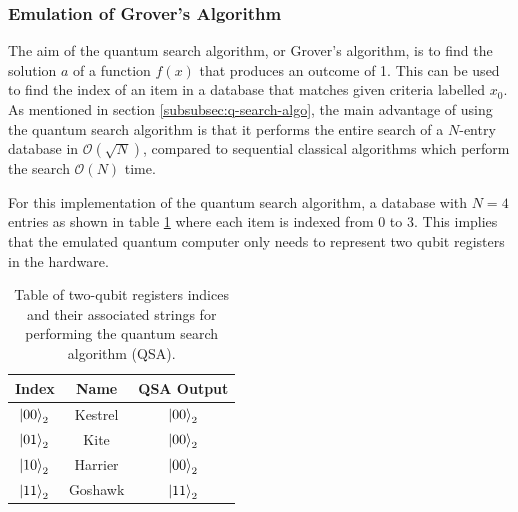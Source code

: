 \subsubsection{Emulation of Grover's Algorithm}

The aim of the quantum search algorithm, or Grover's algorithm, is to find the solution $a$ of a function $f(x)$ that produces an outcome of 1. This can be used to find the index of an item in a database that matches given criteria labelled $x_0$. As mentioned in section \ref{subsubsec:q-search-algo}, the main advantage of using the quantum search algorithm is that it performs the entire search of a $N$-entry database in $\mathcal{O}(\sqrt{N})$, compared to sequential classical algorithms which perform the search $\mathcal{O}(N)$ time. 

For this implementation of the quantum search algorithm, a database with $N = 4$ entries as shown in table \ref{tab:grover-entries} where each item is indexed from 0 to 3. This implies that the emulated quantum computer only needs to represent two qubit registers in the hardware. 

\begin{table}[ht!]
	\centering
	\caption[Table Showing Indices and their Associated Strings for Performing the Quantum Search Algorithm.]{Table of two-qubit registers indices and their associated strings for performing the quantum search algorithm (QSA).}
	\label{tab:grover-entries}
	\begin{tabular}{ |c|c|c| } 
		\hline
		\textbf{Index} & \textbf{Name} & \textbf{QSA Output}\\ 
		\hline
		$\ket{00}_2$ & Kestrel & $\ket{00}_2$ \\ 
		\hline
		$\ket{01}_2$ & Kite & $\ket{00}_2$ \\ 
		\hline
		$\ket{10}_2$ & Harrier & $\ket{00}_2$ \\ 
		\hline
		$\ket{11}_2$ & Goshawk & $\ket{11}_2$ \\ 
		\hline
	\end{tabular}
\end{table}

